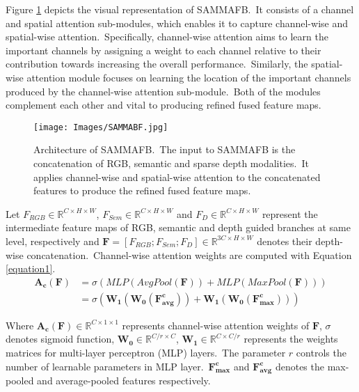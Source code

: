 \documentclass{ieeeaccess}
\begin{document}
 Figure \ref{SAMMAFB_Architecture} depicts the visual representation of SAMMAFB.~It consists of a channel and spatial attention sub-modules, which enables it to capture channel-wise and spatial-wise attention.~Specifically, channel-wise attention aims to learn the important channels by assigning a weight to each channel relative to their contribution towards increasing the overall performance.~Similarly, the spatial-wise attention module focuses on learning the location of the important channels produced by the channel-wise attention sub-module.~Both of the modules complement each other and vital to producing refined fused feature maps.
\begin{figure}
\begin{center}
    \texttt{[image: Images/SAMMABF.jpg]} 
\end{center}
\caption{Architecture of SAMMAFB.~The input to SAMMAFB is the concatenation of RGB, semantic and sparse depth modalities.~It applies channel-wise and spatial-wise attention to the concatenated features to produce the refined fused feature maps. }


\label{SAMMAFB_Architecture}
\end{figure}

Let $F_{RGB} \in \mathbb{R}^{C \times H \times W}$, $F_{Sem} \in \mathbb{R}^{C \times H \times W}$ and $F_{D} \in \mathbb{R}^{C \times H \times W}$ represent the intermediate feature maps of RGB, semantic and depth guided branches at same level, respectively and $\mathbf{F} = \left[F_{RGB};F_{Sem};F_{D}\right] \in \mathbb{R}^{3C \times H \times W}$ denotes their depth-wise concatenation.~Channel-wise attention weights are computed with Equation \ref{equation1}. 
\begin{equation}
\begin{aligned}
\mathbf{{A}_c(F)} &=\sigma(MLP(AvgPool(\mathbf{F}))+MLP(MaxPool(\mathbf{F}))) \\
&=\sigma\left(\mathbf{W_1}\left(\mathbf{W_0}\left(\mathbf{F_{avg}^{c}}\right)\right)+\mathbf{W_1}\left(\mathbf{W_0}\left(\mathbf{F_{max}^{c}}\right)\right)\right)
\end{aligned}
\label{equation1}
\end{equation}

Where $\mathbf{{A}_c(F)} \in \mathbb{R}^{C \times 1 \times 1}$ represents channel-wise attention weights of $\mathbf{F}$, $\sigma$ denotes sigmoid function, $\mathbf{W_{0}} \in \mathbb{R}^{C/r  \times C }$, $\mathbf{W_{1}} \in \mathbb{R}^{C\times C/r }$ represents the weights matrices for multi-layer perceptron (MLP) layers.~The parameter $r$ controls the number of learnable parameters in MLP layer.~$\mathbf{F_{max}^{c}}$ and $\mathbf{F_{avg}^{c}}$  denotes the max-pooled and average-pooled features respectively. 
\end{document}
